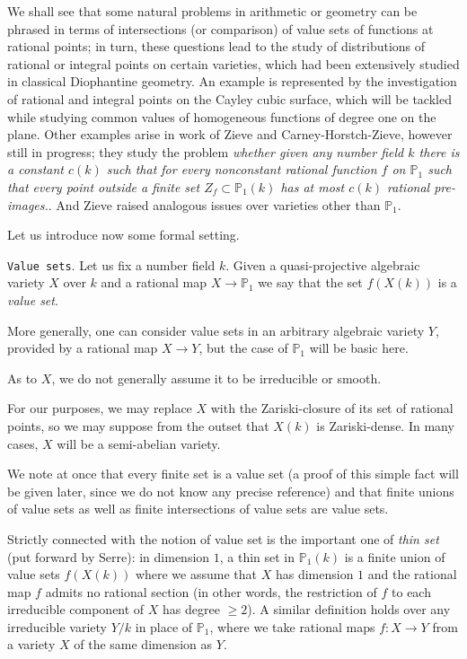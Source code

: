 \documentclass[leqno,12pt]{article} %
\def\P{{{\mathbb P}}}
\theoremstyle{plain} %
\theoremstyle{definition} %
\begin{document}
 We shall see that some natural problems in arithmetic or geometry can be phrased in terms of intersections (or comparison) of value  sets of functions at rational points; in turn, these questions lead to the study of distributions of rational or integral points on certain varieties, which had been extensively studied in classical Diophantine geometry. An example is represented by the investigation of rational and integral points on the Cayley cubic surface, which will be tackled while studying common values of homogeneous functions of degree one on the plane. Other examples arise in work of {\sc Zieve} and {\sc Carney-Horstch-Zieve}, however still in progress; they study the problem {\it whether given any number field $k$ there is a constant $c(k)$ such that for every nonconstant rational function $f$ on $\P_1$   such that every point outside a finite set $Z_f\subset\P_1(k)$ has at most $c(k)$ rational pre-images.}. And {\sc Zieve} raised  analogous issues over varieties other than $\P_1$.


\medskip

Let us introduce now some  formal setting.

\medskip

{\tt Value sets}. Let us fix a number field $k$. Given a quasi-projective algebraic variety $X$ over $k$ and a rational  map  $X\rightarrow \P_1$ we say that the set $f(X(k))$ is a {\it value set}. 

More generally, one can consider value sets in an arbitrary algebraic variety $Y$, provided by a rational map $X\to Y$, but the case of $\P_1$ will be basic here.

\medskip 


As to $X$,  we do not  generally assume it to be irreducible or smooth. 

For our purposes, we may replace $X$ with the Zariski-closure of its set of rational points, so we may suppose from the outset that $X(k)$ is Zariski-dense.  In many cases, $X$ will be a semi-abelian variety.

\medskip

We note at once that every finite set is a value  set (a proof of this simple fact will be given later, since we do not know any precise reference) and that finite unions of value sets as well as finite intersections of value sets are value sets. 

\medskip

Strictly connected with the notion of value set is the important one of {\it thin set} (put forward by {\sc Serre}): in dimension $1$, a thin set in $\P_1(k)$ is a finite union of value sets $f(X(k))$ where we assume that $X$ has dimension $1$ and the rational map $f$ admits no rational section (in other words, the restriction of $f$ to each irreducible component of $X$ has degree $\geq 2$).  A similar definition holds over any irreducible variety $Y/k$ in place of $\P_1$, where we take rational maps $f:X\to Y$  from a variety $X$ of the same dimension as $Y$. 
\end{document}
